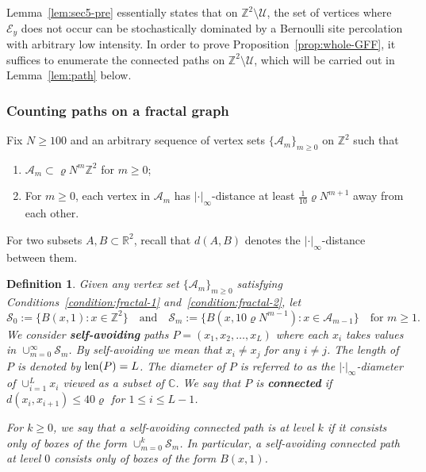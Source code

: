 \documentclass[a4paper]{article}
\numberwithin{equation}{section}
\newtheorem{definition}[theorem]{Definition}
\numberwithin{equation}{section}
\renewcommand{\1}{\mathbf{1}}
\begin{document}
Lemma~\ref{lem:sec5-pre} essentially states that on $\mathbb{Z}^2 \setminus \mathscr{U}$, the set of vertices where $\mathcal{E}_y$ does not occur can be stochastically dominated by a Bernoulli site percolation with arbitrary low intensity. In order to prove Proposition~\ref{prop:whole-GFF}, it suffices to enumerate the connected paths on $\mathbb{Z}^2 \setminus \mathscr{U}$, which will be carried out in Lemma~\ref{lem:path} below.

\subsubsection{Counting paths on a fractal graph}

Fix $N \geq 100$ and an arbitrary sequence of vertex sets $\{\mathcal{A}_m\}_{m \geq 0}$ on $\mathbb{Z}^2$ such that

\begin{enumerate}
    \item \label{condition:fractal-1} $\mathcal{A}_m \subset \varrho N^m \mathbb{Z}^2$ for $m \geq 0$;
    
    \item \label{condition:fractal-2} For $m \geq 0$, each vertex in $\mathcal{A}_m$ has $|\cdot|_\infty$-distance at least $\frac{1}{10} \varrho N^{m+1}$ away from each other.
\end{enumerate}
For two subsets $A,B \subset \mathbb{R}^2$, recall that $d(A,B)$ denotes the $|\cdot|_\infty$-distance between them.

\begin{definition}\label{def:*-connect}
    Given any vertex set $\{\mathcal{A}_m\}_{m \geq 0}$ satisfying Conditions~\ref{condition:fractal-1} and~\ref{condition:fractal-2}, let 
    \begin{equation}\label{eq:step-fractal}
        \mathcal{S}_0:= \{ B(x, 1) : x \in \mathbb{Z}^2\} \quad \mbox{and} \quad \mathcal{S}_m := \{ B(x , 10 \varrho N^{m-1}) : x \in \mathcal{A}_{m-1} \} \quad \mbox{for } m \geq 1.
    \end{equation}
    We consider \textbf{self-avoiding} paths $P=(x_1,x_2,\ldots,x_L)$ where each $x_i$ takes values in $\cup_{m=0}^\infty \mathcal{S}_m$. By self-avoiding we mean that $x_i \neq x_j$ for any $i \neq j$. The length of $P$ is denoted by ${\rm len}(P)=L$. The diameter of $P$ is referred to as the $|\cdot|_\infty$-diameter of $\cup_{i=1}^L x_i$ viewed as a subset of $\mathbb C$. We say that $P$ is \textbf{connected} if $d(x_i, x_{i+1}) \leq 40 \varrho$ for $1 \leq i \leq L-1$.
    
    For $k \geq 0$, we say that a self-avoiding connected path is at level $k$ if it consists only of boxes of the form $\cup_{m=0}^k \mathcal{S}_m$. In particular, a self-avoiding connected path at level $0$ consists only of boxes of the form $B(x,1)$.
\end{definition}
\end{document}
